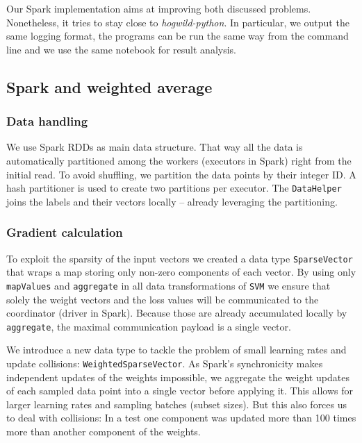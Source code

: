 \documentclass[a4paper, 11pt, conference]{ieeeconf}
\begin{document}
Our Spark implementation aims at improving both discussed problems.
Nonetheless, it tries to stay close to \textit{hogwild-python}. In particular, we output the same logging format, the programs can be run the same way from the command line and we use the same notebook for result analysis.

\subsection{Spark and weighted average}

\subsubsection{Data handling}

We use Spark RDDs as main data structure. That way all the data is automatically partitioned among the workers (executors in Spark) right from the initial read. To avoid shuffling, we partition the data points by their integer ID. A hash partitioner is used to create two partitions per executor. The \texttt{DataHelper} joins the labels and their vectors locally -- already leveraging the partitioning.

\subsubsection{Gradient calculation}
\label{gradient-calculation}

To exploit the sparsity of the input vectors we created a data type \texttt{SparseVector} that wraps a map storing only non-zero components of each vector.
By using only \texttt{mapValues} and \texttt{aggregate} in all data transformations of \texttt{SVM} we ensure that solely the weight vectors and the loss values will be communicated to the coordinator (driver in Spark). Because those are already accumulated locally by \texttt{aggregate}, the maximal communication payload is a single vector.
 
We introduce a new data type to tackle the problem of small learning rates and update collisions: \texttt{WeightedSparseVector}. As Spark's synchronicity makes independent updates of the weights impossible, we aggregate the weight updates of each sampled data point into a single vector before applying it. This allows for larger learning rates and sampling batches (subset sizes). But this also forces us to deal with collisions: In a test one component was updated more than 100 times more than another component of the weights.
\end{document}
